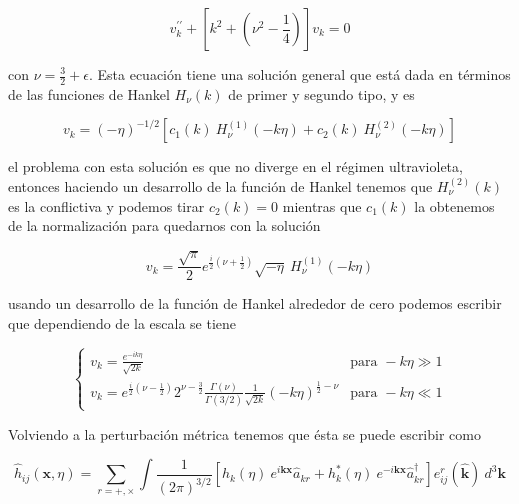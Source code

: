 \begin{equation}
    v^{\prime \prime}_k + \left[ k^2 + \left( \nu^2 - \frac{1}{4} \right) \right] v_k = 0 
\end{equation}

\noindent
con $\displaystyle \nu = \frac{3}{2} + \epsilon$. Esta ecuación tiene una solución general que está dada en términos de las funciones de Hankel $H_\nu (k)$ de primer y segundo tipo, y es

\begin{equation}
    v_k = (- \eta)^{-1/2} \left[ c_1 (k) \ H_\nu^{(1)} (-k \eta) + c_2 (k) \ H_\nu^{(2)} (-k \eta) \right]
\end{equation}

\noindent
el problema con esta solución es que no diverge en el régimen ultravioleta, entonces haciendo un desarrollo de la función de Hankel tenemos que $H_\nu^{(2)} (k)$ es la conflictiva y podemos tirar $c_2 (k) = 0$ mientras que $c_1 (k)$ la obtenemos de la normalización para quedarnos con la solución

\begin{equation}
    v_k = \frac{\sqrt{\pi}}{2} e^{\displaystyle \frac{i
    }{2} \left( \nu + \frac{1}{2} \right)} \sqrt{- \eta} \ H_\nu^{(1)} (-k \eta)
\end{equation}

\noindent
usando un desarrollo de la función de Hankel alrededor de cero podemos escribir que dependiendo de la escala se tiene

\begin{equation}
    \begin{cases}
        \displaystyle v_k = \frac{e^{- i k \eta}}{\sqrt{2 k}} &\text{para } - k \eta \gg 1\\
        \displaystyle v_k = e^{\displaystyle \frac{i}{2} \left( \nu - \frac{1}{2} \right)} 2^{\displaystyle \nu - \frac{3}{2}} \frac{\Gamma (\nu)}{\Gamma (3/2)} \frac{1}{\sqrt{2k}} (- k \eta)^{\displaystyle \frac{1}{2} - \nu} &\text{para } - k\eta \ll 1
    \end{cases}
\end{equation}

Volviendo a la perturbación métrica tenemos que ésta se puede escribir como

\begin{equation}
    \hat{h}_{ij}(\textbf{x}, \eta) = \sum_{r = +, \times} \int \frac{1}{(2 \pi)^{3/2}} \left[ h_k (\eta) \ e^{i\textbf{kx}} \hat{a}_{kr} + h_k^* (\eta) \ e^{-i\textbf{kx}} \hat{a}_{kr}^\dagger  \right] e_{ij}^r \left( \hat{\textbf{k}} \right) \ d^3 \textbf{k} 
\end{equation}

